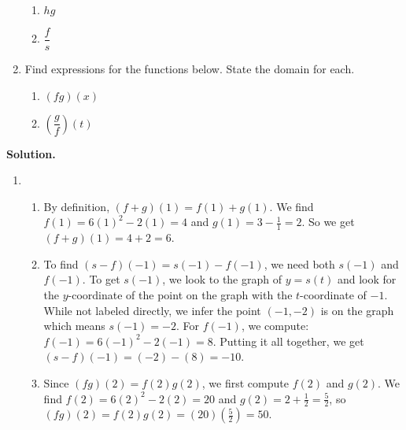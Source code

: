 \documentclass{ximera}
\begin{document}
\begin{example}
\begin{enumerate}
\begin{multicols}{2}
\begin{enumerate}
\item $hg$

\item  $\dfrac{f}{s}$

\end{enumerate}

\end{multicols}

\item \label{arithexpressionex} Find expressions for the functions below.  State the domain for each.

\begin{multicols}{2}

\begin{enumerate}

\item   \label{proddomainex} $(fg)(x)$

\item  \label{quotdomainex}  $\left(\dfrac{g}{f}\right)(t)$

\end{enumerate}

\end{multicols}

\end{enumerate}

{\bf Solution.}  

\begin{enumerate}

\item \begin{enumerate}

\item  By definition, $(f+g)(1) = f(1) + g(1)$.   We find $f(1) = 6(1)^2-2(1) = 4$ and $g(1) = 3 - \frac{1}{1} = 2$. So we get  $(f+g)(1) = 4+2 = 6$.

\item  To find $(s-f)(-1) = s(-1) - f(-1)$, we need both $s(-1)$ and $f(-1)$.  To get $s(-1)$, we look to the graph of $y = s(t)$ and look for the $y$-coordinate of the point on the graph with the $t$-coordinate of $-1$.  While not labeled directly, we infer the point $(-1,-2)$ is on the graph which means $s(-1) = -2$. For $f(-1)$, we compute: $f(-1) = 6(-1)^2-2(-1) = 8$.  Putting it all together, we get $(s-f)(-1) = (-2) -(8) = -10$.

\item Since $(fg)(2) = f(2)g(2)$, we first  compute $f(2)$ and $g(2)$. We find $f(2) = 6(2)^2-2(2) = 20$ and $g(2) = 2 + \frac{1}{2} = \frac{5}{2}$, so $(fg)(2) = f(2) g(2) = (20)\left(\frac{5}{2}\right) = 50$.


\end{enumerate}
\end{enumerate}
\end{example}
\end{document}
